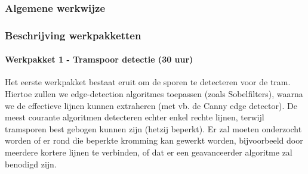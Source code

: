 \documentclass[a4paper,oneside,11pt,final]{memoir}
\begin{document}
\subsubsection{Algemene werkwijze}


\subsubsection{Beschrijving werkpakketten}



\paragraph{Werkpakket 1 - Tramspoor detectie (30 uur)}

Het eerste werkpakket bestaat eruit om de sporen te detecteren voor de tram. Hiertoe zullen we edge-detection algoritmes toepassen (zoals Sobelfilters), waarna we de effectieve lijnen kunnen extraheren (met vb. de Canny edge detector). De meest courante algoritmen detecteren echter enkel rechte lijnen, terwijl tramsporen best gebogen kunnen zijn (hetzij beperkt). Er zal moeten onderzocht worden of er rond die beperkte kromming kan gewerkt worden, bijvoorbeeld door meerdere kortere lijnen te verbinden, of dat er een geavanceerder algoritme zal benodigd zijn.
\end{document}
